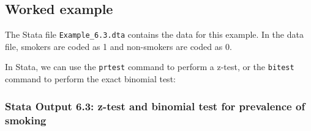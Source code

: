 \documentclass[
]{memoir}
\begin{document}
\hypertarget{worked-example-7}{%
\subsection{Worked example}\label{worked-example-7}}

The Stata file \texttt{Example\_6.3.dta} contains the data for this example. In the data file, smokers are coded as 1 and non-smokers are coded as 0.

In Stata, we can use the \texttt{prtest} command to perform a z-test, or the \texttt{bitest} command to perform the exact binomial test:

\hypertarget{stata-output-6.3-z-test-and-binomial-test-for-prevalence-of-smoking}{%
\subsubsection*{Stata Output 6.3: z-test and binomial test for prevalence of smoking}\label{stata-output-6.3-z-test-and-binomial-test-for-prevalence-of-smoking}}
\end{document}

